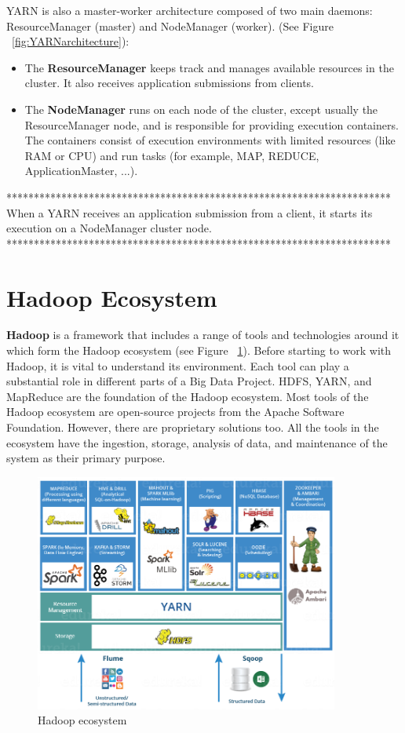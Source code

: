 \documentclass[12pt,english]{book}
\begin{document}

YARN is also a master-worker architecture composed of two main daemons: ResourceManager (master) and NodeManager (worker). (See Figure ~\ref{fig:YARNarchitecture}):

\begin{itemize}
\item
The \textbf{ResourceManager} keeps track and manages available resources in the cluster. It also receives application submissions from clients.

\item
The \textbf{NodeManager} runs on each node of the cluster, except usually the ResourceManager node, and is responsible for providing execution containers. The containers consist of execution environments with limited resources (like RAM or CPU) and run tasks (for example, MAP, REDUCE, ApplicationMaster, ...).
\end{itemize}

**********************************************************************
When a YARN receives an application submission from a client, it starts its execution on a NodeManager cluster node.
**********************************************************************

\section{Hadoop Ecosystem}

\textbf{Hadoop} is a framework that includes a range of tools and technologies around it which form the Hadoop ecosystem (see Figure ~\ref{fig:HadoopEco}).
Before starting to work with Hadoop, it is vital to understand its environment.
Each tool can play a substantial role in different parts of a Big Data Project.
HDFS, YARN, and MapReduce are the foundation of the Hadoop ecosystem. Most tools of the Hadoop ecosystem are open-source projects from the Apache Software Foundation. However, there are proprietary solutions too.
All the tools in the ecosystem have the ingestion, storage, analysis of data, and maintenance of the system as their primary purpose.

\begin{figure}[ht]
	\centering
	\includegraphics[width=10cm]{hadoopEco.png}
	\caption[Hadoop ecosystem]{Hadoop ecosystem \footnotemark}
\label{fig:HadoopEco}
\end{figure}
\end{document}
